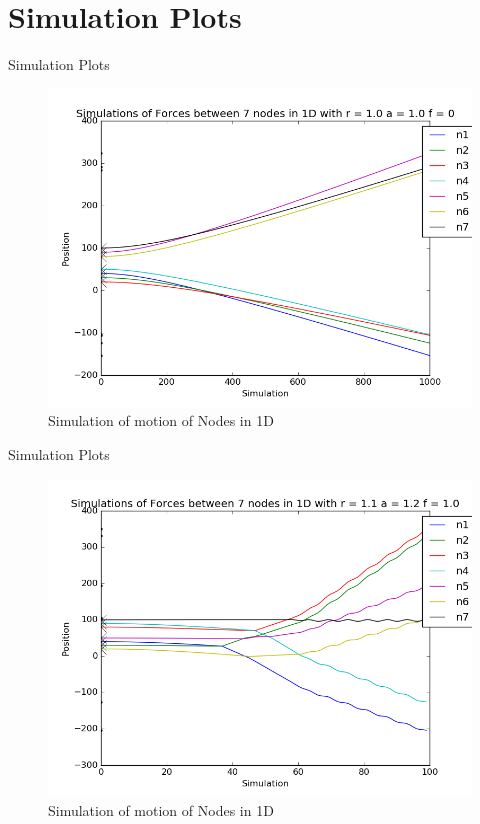 \documentclass{beamer}
\begin{document}
\section{Simulation Plots}

\begin{frame}{Simulation Plots}

\begin{figure}[H]
\label{fig:sim1}
  \includegraphics[scale=0.45]{output1.png}
\caption{Simulation of motion of Nodes in 1D}
\end{figure}


\end{frame}


\begin{frame}{Simulation Plots}

\begin{figure}[H]
\label{fig:sim2}
  \includegraphics[scale=0.45]{output2.png}
\caption{Simulation of motion of Nodes in 1D}

\end{figure}


\end{frame}
\end{document}
